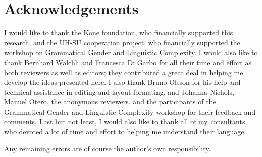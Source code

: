 \documentclass[output=collectionpaper,hidelinks]{langscibook}
\theoremstyle{remark}
\begin{document}
\section*{Acknowledgements}

I would like to thank the Kone foundation, who financially supported this research, and the UH-SU cooperation project, who financially supported the workshop on Grammatical Gender and Linguistic Complexity. I would also like to thank Bernhard Wälchli and Francesca Di Garbo for all their time and effort as both reviewers as well as editors; they contributed a great deal in helping me develop the ideas presented here. I also thank Bruno Olsson for his help and technical assistance in editing and layout formating, and Johanna Nichols, Manuel Otero, the anonymous reviewers, and the participants of the Grammatical Gender and Linguistic Complexity workshop for their feedback and comments. Last but not least, I would also like to thank all of my  consultants, who devoted a lot of time and effort to helping me understand their language.

Any remaining errors are of course the author's own responsibility.

\sloppy
\printbibliography[heading=subbibliography]
\end{document}
